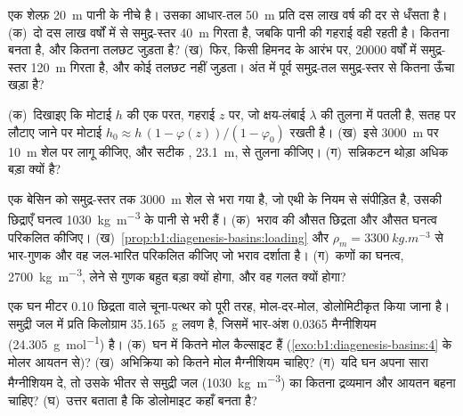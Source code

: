 \begin{exercise}[$\star\star$]\label{exo:b1:diagenesis-basins:9}
एक शेल्फ़ \qty{20}{m} पानी के नीचे है। उसका आधार-तल \qty{50}{m} प्रति दस लाख वर्ष की दर से धँसता है। (क)~दो दस लाख वर्षों में  से समुद्र-स्तर \qty{40}{m} गिरता है, जबकि पानी की गहराई वही रहती है। कितना  बनता है, और कितना तलछट जुड़ता है? (ख)~फिर, किसी हिमनद के आरंभ पर, \num{20000} वर्षों में समुद्र-स्तर \qty{120}{m} गिरता है, और कोई तलछट नहीं जुड़ता। अंत में पूर्व समुद्र-तल समुद्र-स्तर से कितना ऊँचा खड़ा है?
\end{exercise}

\begin{exercise}[$\star\star\star$]\label{exo:b1:diagenesis-basins:10}
(क)~दिखाइए कि मोटाई $h$ की एक परत, गहराई $z$ पर, जो क्षय-लंबाई $\lambda$ की तुलना में पतली है, सतह पर लौटाए जाने पर मोटाई $h_0 \approx h\,(1 - \varphi(z))/(1 -
\varphi_0)$ रखती है। (ख)~इसे \qty{3000}{m} पर \qty{10}{m} शेल पर लागू कीजिए, और सटीक , \qty{23.1}{m}, से तुलना कीजिए। (ग)~सन्निकटन थोड़ा अधिक बड़ा क्यों है?
\end{exercise}

\begin{exercise}[$\star\star\star$]\label{exo:b1:diagenesis-basins:11}
एक बेसिन को समुद्र-स्तर तक \qty{3000}{m} शेल से भरा गया है, जो एथी के नियम से संपीड़ित है, उसकी छिद्राएँ घनत्व \qty{1030}{kg.m^{-3}} के पानी से भरी हैं। (क)~भराव की औसत छिद्रता और औसत घनत्व परिकलित कीजिए। (ख)~\cref{prop:b1:diagenesis-basins:loading} और $\rho_m =
\qty{3300}{kg.m^{-3}}$ से भार-गुणक और वह जल-भारित  परिकलित कीजिए जो भराव दर्शाता है। (ग)~कणों का घनत्व, \qty{2700}{kg.m^{-3}}, लेने से गुणक बहुत बड़ा क्यों होगा, और वह गलत क्यों होगा?
\end{exercise}

\begin{exercise}[$\star\star\star$]\label{exo:b1:diagenesis-basins:12}
एक घन मीटर \num{0.10} छिद्रता वाले चूना-पत्थर को पूरी तरह, मोल-दर-मोल, डोलोमिटीकृत किया जाना है। समुद्री जल में प्रति किलोग्राम \qty{35.165}{g} लवण है, जिसमें भार-अंश \num{0.0365} मैग्नीशियम (\qty{24.305}{g.mol^{-1}}) है। (क)~घन में कितने मोल कैल्साइट हैं (\cref{exo:b1:diagenesis-basins:4} के मोलर आयतन से)? (ख)~अभिक्रिया को कितने मोल मैग्नीशियम चाहिए? (ग)~यदि घन अपना सारा मैग्नीशियम दे, तो उसके भीतर से समुद्री जल (\qty{1030}{kg.m^{-3}}) का कितना द्रव्यमान और आयतन बहना चाहिए? (घ)~उत्तर बताता है कि डोलोमाइट कहाँ बनता है?
\end{exercise}

